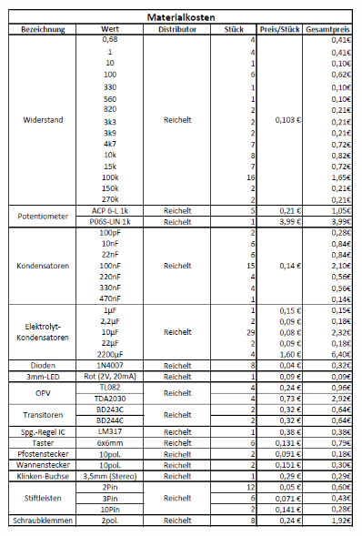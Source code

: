 \begin{figure} [H]
	\centering
	\includegraphics[width=0.9\textwidth]{form/Materialkosten1.png}
\end{figure}
